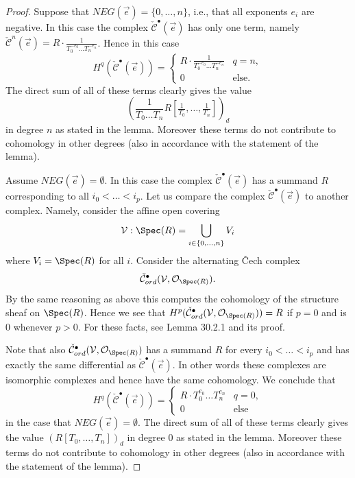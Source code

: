 \begin{proof}
Suppose that $NEG(\vec e)=\{0,\ldots,n\}$, i.e., that all exponents $e_i$ are negative. In this case the complex $\check{\mathcal C}^{\bullet}(\vec e)$ has only one term, namely $\check{\mathcal C}^{n}(\vec e)=R\cdot\frac1{T_0^{-e_0}\ldots T_n^{-e_n}}$. Hence in this case
\[
H^q(\check{\mathcal C}^{\bullet}(\vec e))=
\begin{cases}R\cdot\frac1{T_0^{-e_0}\ldots T_n^{-e_n}}&q=n,\\0&\text{else}.\end{cases}
\]
The direct sum of all of these terms clearly gives the value
\[
\left(\frac1{T_0\ldots T_n}R[\tfrac1{T_0},\ldots,\tfrac1{T_n}]\right)_d
\]
in degree $n$ as stated in the lemma. Moreover these terms do not contribute to cohomology in other degrees (also in accordance with the statement of the lemma).

Assume $NEG(\vec e)=\emptyset$. In this case the complex $\check{\mathcal C}^{\bullet}(\vec e)$ has a summand $R$ corresponding to all $i_0<\ldots<i_p$. Let us compare the complex $\check{\mathcal C}^{\bullet}(\vec e)$ to another complex. Namely, consider the affine open covering
\[
\mathcal V:\Spec(R)=\bigcup_{i\in\{0,\ldots,n\}}V_i
\]
where $V_i=\Spec(R)$ for all $i$. Consider the alternating \v Cech complex
\[
\check{\mathcal C}_{ord}^{\bullet}(\mathcal V,\mathcal O_{\Spec(R)}).
\]
By the same reasoning as above this computes the cohomology of the structure sheaf on $\Spec(R)$. Hence we see that $H^p(\check{\mathcal C}_{ord}^{\bullet}(\mathcal V,\mathcal O_{\Spec(R)}))=R$ if $p=0$ and is $0$ whenever $p>0$. For these facts, see Lemma 30.2.1 and its proof.

Note that also $\check{\mathcal C}_{ord}^{\bullet}(\mathcal V,\mathcal O_{\Spec(R)})$ has a summand $R$ for every $i_0<\ldots<i_p$ and has exactly the same differential as $\check{\mathcal C}^{\bullet}(\vec e)$. In other words these complexes are isomorphic complexes and hence have the same cohomology. We conclude that
\[
H^q(\check{\mathcal C}^{\bullet}(\vec e))=
\begin{cases}R\cdot T_0^{e_0}\ldots T_n^{e_n}&q=0,\\0&\text{else}\end{cases}
\]
in the case that $NEG(\vec e)=\emptyset$. The direct sum of all of these terms clearly gives the value $(R[T_0,\ldots,T_n])_d$ in degree $0$ as stated in the lemma. Moreover these terms do not contribute to cohomology in other degrees (also in accordance with the statement of the lemma).


\end{proof}

